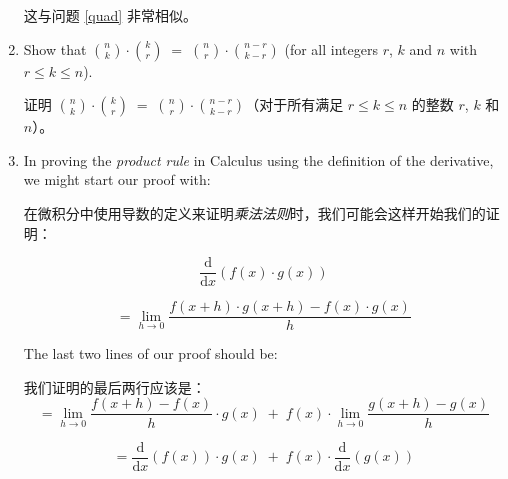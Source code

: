 \begin{enumerate}
{    这与问题 \ref{quad} 非常相似。}
    
    \wbvfill
    
    \workbookpagebreak
    
    \item Show that $\binom{n}{k} \cdot \binom{k}{r} \; = \; \binom{n}{r} \cdot \binom{n-r}{k-r}$ (for all integers $r$, $k$ and $n$ with $r \leq k \leq n$).
    
    证明 $\binom{n}{k} \cdot \binom{k}{r} \; = \; \binom{n}{r} \cdot \binom{n-r}{k-r}$（对于所有满足 $r \leq k \leq n$ 的整数 $r$, $k$ 和 $n$）。
    
    \wbvfill
    
    \workbookpagebreak
    
    \item In proving the  \emph{product rule} in Calculus using the definition of the derivative, we might start our proof with:
    
    在微积分中使用导数的定义来证明\emph{乘法法则}时，我们可能会这样开始我们的证明：
    
    \[
    \frac{\mbox{d}}{\mbox{d}x} \left( f(x) \cdot g(x) \right)
    \]
    
    \[ = \lim_{h \longrightarrow 0} \frac{f(x+h) \cdot g(x+h) - f(x) \cdot g(x)}{h} \]
    
    \noindent The last two lines of our proof should be:
    
    \noindent 我们证明的最后两行应该是：
    \[
    = \lim_{h \longrightarrow 0} \frac{f(x+h) - f(x)}{h} \cdot g(x) \; + \; f(x) \cdot \lim_{h \longrightarrow 0} \frac{g(x+h) - g(x)}{h}
    \]
    
    \[
    = \frac{\mbox{d}}{\mbox{d}x}\left( f(x) \right) \cdot g(x) \; + \; f(x) \cdot \frac{\mbox{d}}{\mbox{d}x}\left( g(x) \right) 
    \]
    

\end{enumerate}
